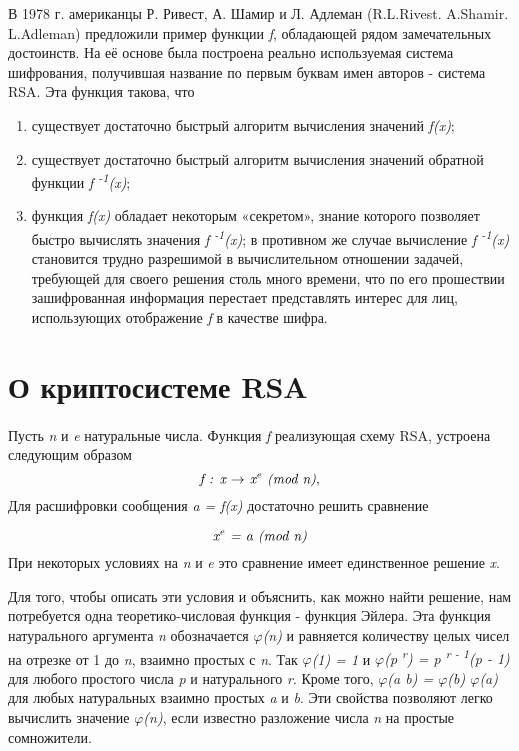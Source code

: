   В 1978 г. американцы Р. Ривест, А. Шамир и Л. Адлеман (R.L.Rivest. A.Shamir. L.Adleman) предложили пример функции \textit{f}, обладающей рядом 
замечательных достоинств. На её основе была построена реально используемая система шифрования, получившая название по первым буквам имен авторов - 
система RSA. Эта функция такова, что
\begin{enumerate}
    \item существует достаточно быстрый алгоритм вычисления значений \textit{f(x)};
    \item существует достаточно быстрый алгоритм вычисления значений обратной функции \textit{f\textsuperscript{ -1}(x)};
    \item функция \textit{f(x)} обладает некоторым «секретом», знание которого позволяет быстро вычислять значения \textit{f\textsuperscript{ -1}(x)};
в противном же случае вычисление \textit{f\textsuperscript{ -1}(x)} становится трудно разрешимой в вычислительном отношении задачей, требующей для 
своего решения столь много времени, что по его прошествии зашифрованная информация перестает представлять интерес для лиц, 
использующих отображение \textit{f} в качестве шифра.
\end{enumerate}	

\section*{О криптосистеме RSA}

\paragraph{} Пусть \textit{n} и \textit{e} натуральные числа. Функция \textit{f} реализующая схему RSA, устроена следующим образом
\begin{equation}
  \textit{f : x {$\rightarrow$} x\textsuperscript{e} (mod n)},
\end{equation}
Для расшифровки сообщения \textit{a = f(x)} достаточно решить сравнение 

\begin{equation}
  \textit{x\textsuperscript{e} = a (mod n)} 
\end{equation}
При некоторых условиях на \textit{n} и \textit{e} это сравнение имеет единственное решение \textit{x}.

  Для того, чтобы описать эти условия и объяснить, как можно найти решение, нам потребуется одна теоретико-числовая функция - функция Эйлера. 
Эта функция натурального аргумента \textit{n} обозначается \textit{{$\varphi$}(n)} и равняется количеству целых чисел на отрезке от 1 до \textit{n}, 
взаимно простых с \textit{n}. Так \textit{{$\varphi$}(1) = 1} и \textit{{$\varphi$}(p\textsuperscript{ r}) = p\textsuperscript{ r - 1}(p - 1)} 
для любого простого числа \textit{p} и натурального \textit{r}. Кроме того, \textit{{$\varphi$}(a b) = {$\varphi$}(b) {$\varphi$}(a)} 
для любых натуральных взаимно простых \textit{a} и \textit{b}. Эти свойства позволяют легко вычислить значение \textit{{$\varphi$}(n)}, если известно 
разложение числа \textit{n} на простые сомножители. 

